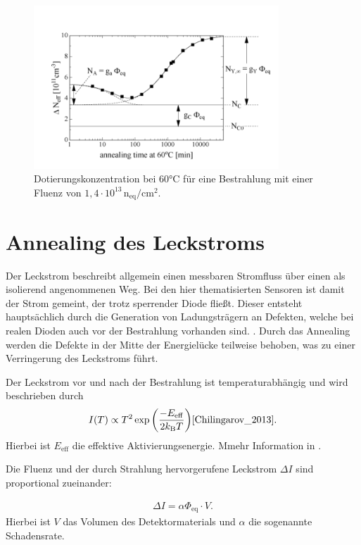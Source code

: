\begin{figure}
  \centering
  \includegraphics[width=0.82\textwidth]{logos/n_eff_beispiel.PNG}
  \caption{Dotierungskonzentration bei 60°C für eine Bestrahlung mit einer Fluenz von
  $1,4\cdot 10^{13} \, \mathrm{n_{eq}/cm^2}$.\cite{moll}}
  \label{fig:n_eff_beispiel}
\end{figure}



\section{Annealing des Leckstroms}
Der Leckstrom beschreibt allgemein einen messbaren Stromfluss über einen als isolierend
angenommenen Weg. Bei den hier thematisierten Sensoren ist damit der Strom gemeint, der trotz sperrender
Diode fließt. Dieser entsteht hauptsächlich durch die Generation von Ladungsträgern an Defekten, welche
bei realen Dioden auch vor der Bestrahlung vorhanden sind. \cite{moll}.
Durch das Annealing werden die Defekte in der Mitte der Energielücke teilweise behoben,
was zu einer Verringerung des Leckstroms führt.

Der Leckstrom vor und nach der Bestrahlung ist temperaturabhängig und wird
beschrieben durch
\begin{align}
  I(T) \propto T^2 \exp{\left(\frac{-E_{\mathrm{eff}}}{2 k_{\mathrm{B}}T}\right)} \text{\cite{Chilingarov_2013}} \label{eqn:Chilingarov_2013}.
\end{align}
Hierbei ist $E_{\mathrm{eff}}$ die  effektive Aktivierungsenergie. Mmehr Information in \cite{Chilingarov_2013}.

Die Fluenz und der durch Strahlung hervorgerufene Leckstrom $\Delta I$ sind
proportional zueinander:


\begin{align}
  \Delta I = \alpha \Phi_{\mathrm{eq}} \cdot V .
\end{align}
Hierbei ist $V$ das Volumen des Detektormaterials und $\alpha$ die
sogenannte Schadensrate.




